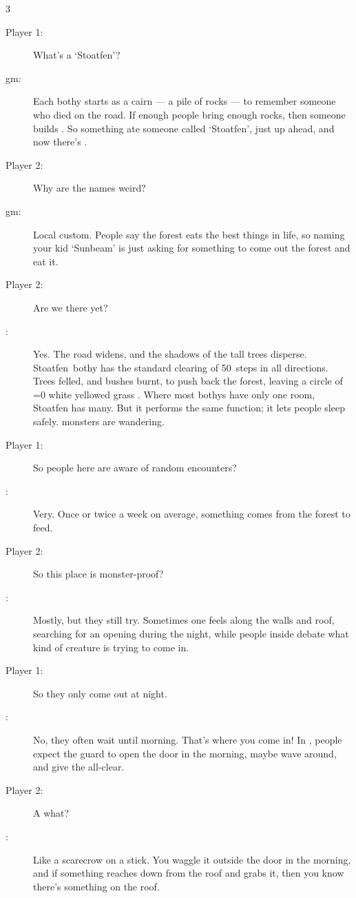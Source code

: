 \begin{multicols}{3}
\begin{description}
  \item[Player 1:]
  What's a `Stoatfen'?
  \item[\Gls{gm}:]
  Each \gls{bothy} starts as a cairn --- a pile of rocks --- to remember someone who died on the road.
  If enough people bring enough rocks, then someone builds .
  So something ate someone called `Stoatfen', just up ahead, and now there's .
  \item[Player 2:]
  Why are the names weird?
  \item[\Gls{gm}:]
  Local custom.
  People say the forest eats the best things in life, so naming your kid `Sunbeam' is just asking for something to come out the forest and eat it.
  \item[Player 2:]
  Are we there yet?
  \item[:]
  Yes.
  The road widens, and the shadows of the tall trees disperse.
  Stoatfen~\Gls{bothy} has the standard clearing of 50~\glspl{step} in all directions.
  Trees felled, and bushes burnt, to push back the forest, leaving a circle of
  \ifnum\value{temperature}=0%
    white%
  \else%
    yellowed grass%
  \fi.%
  Where most \glspl{bothy} have only one room, Stoatfen has many.
  But it performs the same function; it lets people sleep safely.
  \Glspl{monster} are wandering.
  \item[Player 1:]
  So people here are aware of random encounters?
  \item[:]
  Very.
  Once or twice a week on average, something comes from the forest to feed.
  \item[Player 2:]
  So this place is \gls{monster}-proof?
  \item[:]
  Mostly, but they still try.
  Sometimes one feels along the walls and roof, searching for an opening during the night, while people inside debate what kind of creature is trying to come in.
  \item[Player 1:]
  So they only come out at night.
  \item[:]
  No, they often wait until morning.
  That's where you come in!
  In , people expect the \gls{guard} to open the door in the morning, maybe wave  around, and give the all-clear.
  \item[Player 2:]
  A what?
  \item[:]
  Like a scarecrow on a stick.
  You waggle it outside the door in the morning, and if something reaches down from the roof and grabs it, then you know there's something on the roof.

\end{description}
\end{multicols}
